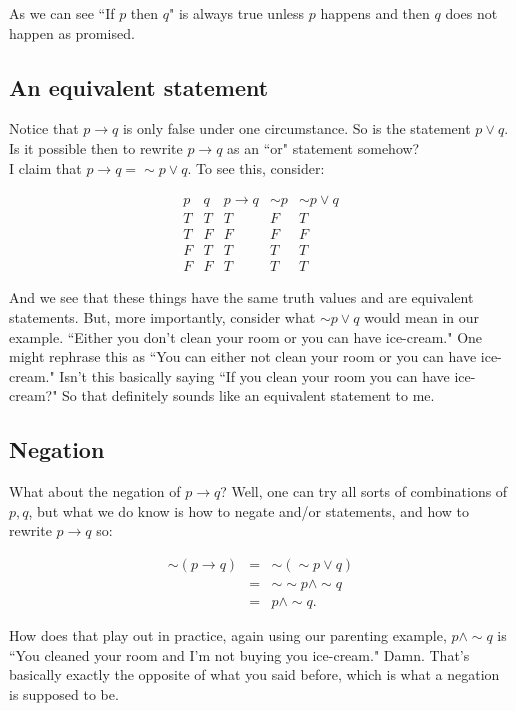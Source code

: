 \documentclass[10pt]{article}
\theoremstyle{definition}
\begin{document}
As we can see ``If $p$ then $q$" is always true unless $p$ happens and then $q$ does not happen as promised.

\subsection{An equivalent statement}

Notice that $p\to q$ is only false under one circumstance.  So is the statement $p\vee q$.  Is it possible then to rewrite $p\to q$ as an ``or" statement somehow?\\

I claim that $p \to q = \sim p \vee q$.  To see this, consider:


 
$$
\begin{array}{c|c|c|c|c}
p&q&p\to q&\sim p & \sim p \vee q\\
\hline
T&T&T&F&T\\
T&F&F&F&F\\
F&T&T&T&T\\
F&F&T&T&T
\end{array}
$$

And we see that these things have the same truth values and are equivalent statements.  But, more importantly, consider what $\sim p \vee q$ would mean in our example.  ``Either you don't clean your room or you can have ice-cream."  One might rephrase this as ``You can either not clean your room or you can have ice-cream."  Isn't this basically saying ``If you clean your room you can have ice-cream?"  So that definitely sounds like an equivalent statement to me.

\subsection{Negation}

What about the negation of $p\to q$?  Well, one can try all sorts of combinations of $p, q$, but what we do know is how to negate and/or statements, and how to rewrite $p\to q$ so:

\begin{eqnarray*}
\sim(p\to q)&=&\sim(\sim p \vee q)\\
&=&\sim\sim p\wedge \sim q\\
&=&p\wedge \sim q.
\end{eqnarray*}

How does that play out in practice, again using our parenting example, $p\wedge \sim q$ is ``You cleaned your room and I'm not buying you ice-cream."  Damn.  That's basically exactly the opposite of what you said before, which is what a negation is supposed to be.  
\end{document}
